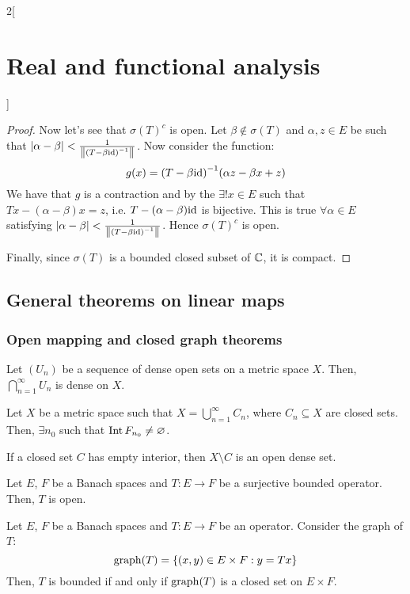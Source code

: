 \documentclass[../../../main_math.tex]{subfiles}
\begin{document}
\begin{multicols}{2}[\section{Real and functional analysis}]
\begin{proof}
    Now let's see that ${\sigma(T)}^c$ is open. Let $\beta\notin\sigma(T)$ and $\alpha,z\in E$ be such that $\abs{\alpha-\beta}<\frac{1}{\left\|{(T-\beta\mathrm{id})}^{-1}\right\|}$. Now consider the function:
    $$g(x)={(T-\beta \mathrm{id})}^{-1}(\alpha z-\beta x +z)$$
    We have that $g$ is a contraction and by the  $\exists!x\in E$ such that $Tx-(\alpha-\beta) x=z$, i.e. $T-(\alpha-\beta)\mathrm{id}$ is bijective. This is true $\forall\alpha\in E$ satisfying $\abs{\alpha-\beta}<\frac{1}{\left\|{(T-\beta\mathrm{id})}^{-1}\right\|}$. Hence ${\sigma(T)}^c$ is open.

    Finally, since $\sigma(T)$ is a bounded closed subset of $\mathbb{C}$, it is compact.
  \end{proof}
  \subsection{General theorems on linear maps}
  \subsubsection{Open mapping and closed graph theorems}
  \begin{theorem}
    Let $(U_n)$ be a sequence of dense open sets on a metric space $X$. Then, $\bigcap_{n=1}^\infty U_n$ is dense on $X$.
  \end{theorem}
  \begin{corollary}
    Let $X$ be a metric space such that $X=\bigcup_{n=1}^\infty C_n$, where $C_n\subseteq X$ are closed sets. Then, $\exists n_0$ such that $\operatorname{Int} F_{n_0}\ne \varnothing$.
  \end{corollary}
  \begin{sproof}
    If a closed set $C$ has empty interior, then $X\setminus C$ is an open dense set.
  \end{sproof}
  \begin{theorem}
    Let $E$, $F$ be a Banach spaces and $T:E\rightarrow F$ be a surjective bounded operator. Then, $T$ is open.
  \end{theorem}
  \begin{theorem}
    Let $E$, $F$ be a Banach spaces and $T:E\rightarrow F$ be an operator. Consider the graph of $T$: $$\operatorname{graph}(T)=\{(x,y)\in E\times F:y=Tx\}$$
    Then, $T$ is bounded if and only if $\operatorname{graph}(T)$ is a closed set on $E\times F$.
  \end{theorem}

\end{multicols}
\end{document}
